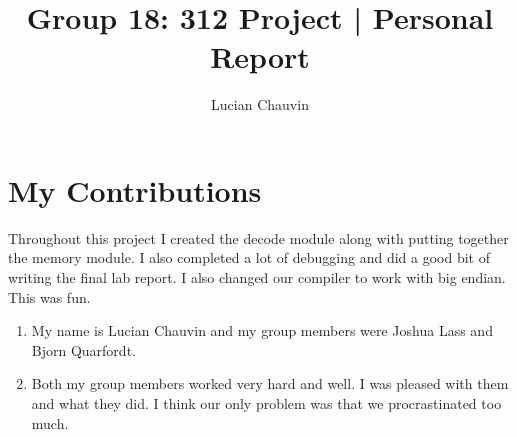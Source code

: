 \documentclass{article}
\title{Group 18: 312 Project | Personal Report}
\author{Lucian Chauvin}
\begin{document}
\maketitle
    \vspace{-2cm}
\section{My Contributions}
Throughout this project I created the decode module along with putting together the memory module. I also completed a lot of debugging and did a good bit of writing the final lab report. I also changed our compiler to work with big endian. This was fun.
\begin{enumerate}
    \item My name is Lucian Chauvin and my group members were Joshua Lass and Bjorn Quarfordt.
    \item Both my group members worked very hard and well. I was pleased with them and what they did. I think our only problem was that we procrastinated too much.
\end{enumerate}
\end{document}
